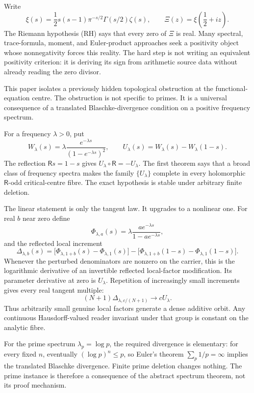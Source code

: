 \documentclass[11pt]{article}
\newcommand{\FE}{\mathsf R}
\begin{document}
Write
\[
 \xi(s)=\frac12s(s-1)\pi^{-s/2}\Gamma(s/2)\zeta(s),
 \qquad
 \Xi(z)=\xi\!\left(\frac12+iz\right).
 \tag{1.1}
\]
The Riemann hypothesis (RH) says that every zero of \(\Xi\) is real.  Many spectral,
trace-formula, moment, and Euler-product approaches seek a positivity object whose
nonnegativity forces this reality.  The hard step is not writing an equivalent
positivity criterion: it is deriving its sign from arithmetic source data without
already reading the zero divisor.

This paper isolates a previously hidden topological obstruction at the
functional-equation centre.  The obstruction is not specific to primes.  It is a
universal consequence of a translated Blaschke-divergence condition on a positive
frequency spectrum.

For a frequency \(\lambda>0\), put
\[
 W_\lambda(s)
  =\lambda\frac{e^{-\lambda s}}{(1-e^{-\lambda s})^2},
 \qquad
 U_\lambda(s)=W_\lambda(s)-W_\lambda(1-s).
 \tag{1.2}
\]
The reflection \(\FE s=1-s\) gives \(U_\lambda\circ\FE=-U_\lambda\).
The first theorem says that a broad class of frequency spectra makes the family
\(\{U_\lambda\}\) complete in every holomorphic \(\FE\)-odd critical-centre
fibre.  The exact hypothesis is stable under arbitrary finite deletion.

The linear statement is only the tangent law.  It upgrades to a nonlinear one.
For real \(b\) near zero define
\[
 \Phi_{\lambda,a}(s)
   =\lambda\frac{a e^{-\lambda s}}{1-ae^{-\lambda s}},
 \tag{1.3}
\]
and the reflected local increment
\[
 \Delta_{\lambda,b}(s)
 =\bigl[\Phi_{\lambda,1+b}(s)-\Phi_{\lambda,1}(s)\bigr]
  -\bigl[\Phi_{\lambda,1+b}(1-s)-\Phi_{\lambda,1}(1-s)\bigr].
 \tag{1.4}
\]
Whenever the perturbed denominators are nonzero on the carrier, this is the
logarithmic derivative of an invertible reflected local-factor modification.  Its
parameter derivative at zero is \(U_\lambda\).  Repetition of increasingly small
increments gives every real tangent multiple:
\[
 (N+1)\Delta_{\lambda,c/(N+1)}
   \longrightarrow cU_\lambda.
 \tag{1.5}
\]
Thus arbitrarily small genuine local factors generate a dense additive orbit.  Any
continuous Hausdorff-valued reader invariant under that group is constant on the
analytic fibre.

For the prime spectrum \(\lambda_p=\log p\), the required divergence is elementary:
for every fixed \(n\), eventually \((\log p)^n\leq p\), so Euler's theorem
\(\sum_p1/p=\infty\) implies the translated Blaschke divergence.  Finite prime
deletion changes nothing.  The prime instance is therefore a consequence of the
abstract spectrum theorem, not its proof mechanism.
\end{document}
